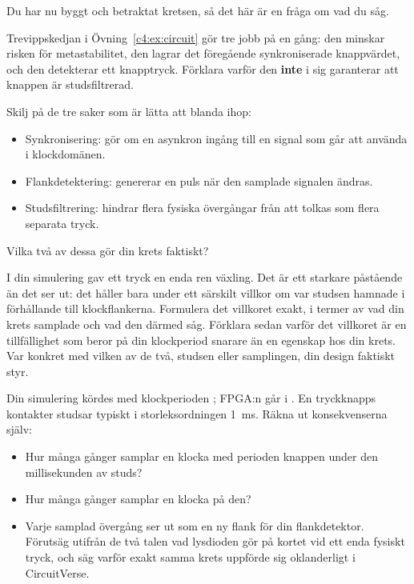
\label{c4:ex:debounce}
Du har nu byggt och betraktat kretsen, så det här är en fråga om vad du såg.

Trevippskedjan i Övning~\ref{c4:ex:circuit} gör tre jobb på en gång: den minskar risken för
metastabilitet, den lagrar det föregående synkroniserade knappvärdet, och den detekterar ett
knapptryck. Förklara varför den \textbf{inte} i sig garanterar att knappen är studsfiltrerad.

 Skilj på de tre saker som är lätta att blanda ihop:
\begin{itemize}
  \item Synkronisering: gör om en asynkron ingång till en signal som går att använda i
    klockdomänen.
  \item Flankdetektering: genererar en puls när den samplade signalen ändras.
  \item Studsfiltrering: hindrar flera fysiska övergångar från att tolkas som flera separata tryck.
\end{itemize}
Vilka två av dessa gör din krets faktiskt?

 I din simulering gav ett tryck en enda ren växling. Det är ett starkare påstående än det
ser ut: det håller bara under ett särskilt villkor om var studsen hamnade i förhållande till
klockflankerna. Formulera det villkoret exakt, i termer av vad din krets samplade och vad den
därmed såg. Förklara sedan varför det villkoret är en tillfällighet som beror på din klockperiod
snarare än en egenskap hos din krets. Var konkret med vilken av de två, studsen eller samplingen,
din design faktiskt styr.

 Din simulering kördes med klockperioden ; FPGA:n går i . En
tryckknapps kontakter studsar typiskt i storleksordningen 1~ms. Räkna ut konsekvenserna själv:
\begin{itemize}
  \item Hur många gånger samplar en klocka med perioden  knappen under den
    millisekunden av studs?
  \item Hur många gånger samplar en klocka på  den?
  \item Varje samplad övergång ser ut som en ny flank för din flankdetektor. Förutsäg utifrån de
    två talen vad lysdioden gör på kortet vid ett enda fysiskt tryck, och säg varför exakt samma
    krets uppförde sig oklanderligt i CircuitVerse.
\end{itemize}

